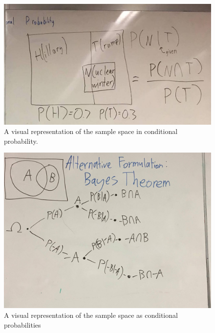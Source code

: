 \documentclass{article}
\begin{document}
\begin{figure}[htb]
\centering
\includegraphics[width=.9\linewidth]{./img/conditional_probability_2.jpg}
\caption{\label{fig:orgparagraph2}
A visual representation of the sample space in conditional probability.}
\end{figure}

\begin{figure}[htb]
\centering
\includegraphics[width=.9\linewidth]{./img/bayes_tree.jpg}
\caption{\label{fig:orgparagraph3}
A visual representation of the sample space as conditional probabilities}
\end{figure}
\end{document}
